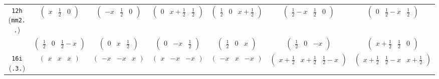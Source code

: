 \documentclass[fleqn,9pt,landscape]{jsarticle}
\begin{document}
\begin{center}
\begin{longtable}{ccccccc}
{\tt 12h} ({\tt mm2..}) & $ \begin{pmatrix} x & \frac{1}{2} & 0 \end{pmatrix} $ & $ \begin{pmatrix} - x & \frac{1}{2} & 0 \end{pmatrix} $ & $ \begin{pmatrix} 0 & x + \frac{1}{2} & \frac{1}{2} \end{pmatrix} $ & $ \begin{pmatrix} \frac{1}{2} & 0 & x + \frac{1}{2} \end{pmatrix} $ & $ \begin{pmatrix} \frac{1}{2} - x & \frac{1}{2} & 0 \end{pmatrix} $ & $ \begin{pmatrix} 0 & \frac{1}{2} - x & \frac{1}{2} \end{pmatrix} $ \\
& $ \begin{pmatrix} \frac{1}{2} & 0 & \frac{1}{2} - x \end{pmatrix} $ & $ \begin{pmatrix} 0 & x & \frac{1}{2} \end{pmatrix} $ & $ \begin{pmatrix} 0 & - x & \frac{1}{2} \end{pmatrix} $ & $ \begin{pmatrix} \frac{1}{2} & 0 & x \end{pmatrix} $ & $ \begin{pmatrix} \frac{1}{2} & 0 & - x \end{pmatrix} $ & $ \begin{pmatrix} x + \frac{1}{2} & \frac{1}{2} & 0 \end{pmatrix} $ \\ \hline
{\tt 16i} ({\tt .3.}) & $ \begin{pmatrix} x & x & x \end{pmatrix} $ & $ \begin{pmatrix} - x & - x & x \end{pmatrix} $ & $ \begin{pmatrix} x & - x & - x \end{pmatrix} $ & $ \begin{pmatrix} - x & x & - x \end{pmatrix} $ & $ \begin{pmatrix} x + \frac{1}{2} & x + \frac{1}{2} & \frac{1}{2} - x \end{pmatrix} $ & $ \begin{pmatrix} x + \frac{1}{2} & \frac{1}{2} - x & x + \frac{1}{2} \end{pmatrix} $ \\

\end{longtable}
\end{center}
\end{document}
